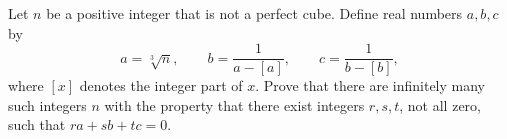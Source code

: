 Let $n$ be a positive integer that is not a perfect cube. Define real numbers $a, b, c$ by
\[ a = \sqrt[3]{n}, \qquad b = \frac{1}{a - [a]}, \qquad c = \frac{1}{b - [b]}, \]
where $[x]$ denotes the integer part of $x$. Prove that there are infinitely many such integers $n$ with the property that there exist integers $r, s, t$, not all zero, such that $ra + sb + tc = 0$.

